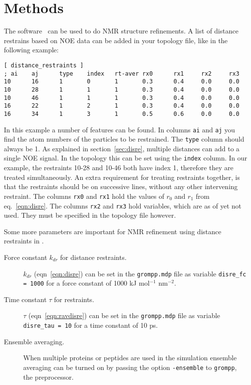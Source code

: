 \documentclass[11pt,dvips]{article}
\begin{document}
\section{Methods}
The {\gromacs} software~\cite{Berendsen95a,gmx2} 
can be used to do NMR structure refinements.
A list of distance restrains based on NOE data can be added in your
topology file, like in the following example:
\begin{verbatim}
[ distance_restraints ]
; ai    aj      type    index   rt-aver rx0      rx1     rx2     rx3
10      16      1       0       1       0.3      0.4     0.0     0.0 
10      28      1       1       1       0.3      0.4     0.0     0.0 
10      46      1       1       1       0.3      0.4     0.0     0.0 
16      22      1       2       1       0.3      0.4     0.0     0.0 
16      34      1       3       1       0.5      0.6     0.0     0.0 
\end{verbatim}
In this example a number of features can be found.
In columns {\tt ai} and {\tt aj} you find the atom numbers of the
particles to be restrained. The {\tt type} column should always be 1.
As explained in section~\ref{sec:disre}, multiple distances can add
to a single NOE signal. In the topology this can be set using the
{\tt index} column. In our example, the restraints 10-28 and 10-46
both have index 1, therefore they are treated simultaneously.
An extra requirement for treating restraints together, is that 
the restraints should be on successive lines, without any
other intervening restraint. The columns {\tt rx0} and {\tt rx1} hold
the values of $r_0$ and $r_1$ from eq.~\ref{eqn:disre}.
The columns {\tt rx2} and {\tt rx3} hold variables, which are as of yet 
not used. They must be specified in the topology file however.

Some more parameters are important for NMR refinement using
distance restraints in {\gromacs}.
\begin{description}
\item[Force constant $k_{dr}$ for distance restraints.] 
	$k_{dr}$  (eqn~\ref{eqn:disre}) can be set in the {\tt grompp.mdp} file
	as variable {\tt disre\_fc = 1000} for a force constant of
	1000 {kJ mol$^{-1}$ nm$^{-2}$}.
\item[Time constant $\tau$ for restraints.] 
	$\tau$ (eqn~\ref{eqn:ravdisre}) can be set in the {\tt grompp.mdp} file
	as variable {\tt disre\_tau = 10} for a time constant of
	10 ps.
\item[Ensemble averaging.] When multiple proteins or peptides are used
	in the simulation ensemble averaging 
	can be turned on by passing the option
	{\tt -ensemble} to {\tt grompp}, the {\gromacs}
	preprocessor.
\end{description}
\end{document}
